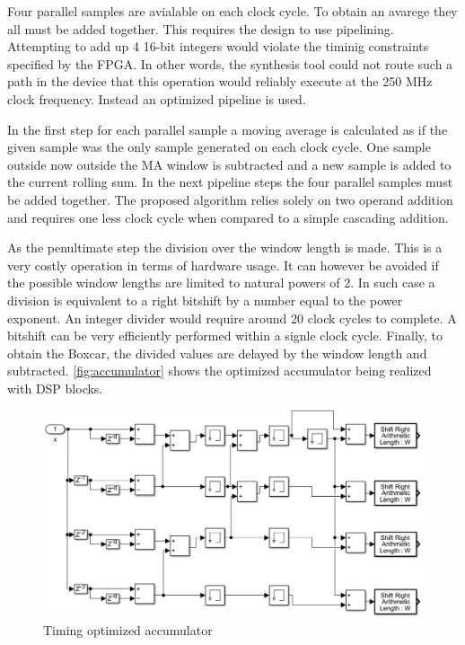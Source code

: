 Four parallel samples are avialable on each clock cycle. To obtain
an avarege they all must be added together. This requires the design
to use pipelining. Attempting to add up 4 16-bit integers would
violate the timinig constraints specified by the FPGA. In other words,
the synthesis tool could not route such a path in the device
that this operation would reliably execute at the 250 MHz clock frequency.
Instead an optimized pipeline is used. 


In the first step for each parallel sample a moving average is calculated
as if the given sample was the only sample generated on each clock cycle. 
One sample outside now outside the MA window is subtracted and a new sample
is added to the current rolling sum. In the next pipeline steps 
the four parallel samples must be added together. The proposed algorithm
relies solely on two operand addition and requires one less clock cycle
when compared to a simple cascading addition. 


As the penultimate step the division over the window length is made.
This is a very costly operation in terms of hardware usage.
It can however be avoided if the possible window lengths are limited to 
natural powers of 2. In such case a division is equivalent to a  
right bitshift by a number equal to the power exponent.
An integer divider would require around 20 clock cycles to complete.
A bitshift can be very efficiently performed within a signle clock cycle.
Finally, to obtain the Boxcar, the divided values are delayed by the
window length and subtracted. \autoref{fig:accumulator} shows
the optimized accumulator being realized with DSP blocks.

\begin{figure}[H]
  \centering
  \includegraphics[width=\linewidth]{media/accumulator.png}
  \caption{Timing optimized accumulator}
  \label{fig:accumulator} 
\end{figure}

